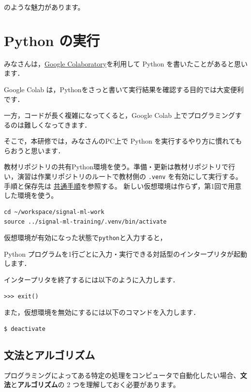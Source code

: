 のような魅力があります。


\section{Python の実行}

みなさんは，\href{https://colab.research.google.com/}{Google Colaboratory}を利用して Python を書いたことがあると思います．

Google Colab は，Pythonをさっと書いて実行結果を確認する目的では大変便利です．

一方，コードが長く複雑になってくると，Google Colab 上でプログラミングするのは難しくなってきます．

そこで，本研修では，みなさんのPC上で Python を実行するやり方に慣れてもらおうと思います．


教材リポジトリの共有Python環境を使う。準備・更新は教材リポジトリで行い，演習は作業リポジトリのルートで教材側の \texttt{.venv} を有効にして実行する。手順と保存先は \href{https://github.com/ykinolab-tokai/signal-ml-training/blob/main/handouts/README.md}{共通手順}を参照する。
新しい仮想環境は作らず，第1回で用意した環境を使う。

\begin{lstlisting}[style=codecell]
cd ~/workspace/signal-ml-work
source ../signal-ml-training/.venv/bin/activate
\end{lstlisting}

仮想環境が有効になった状態で\texttt{python}と入力すると，

Python プログラムを1行ごとに入力・実行できる対話型のインタープリタが起動します．

インタープリタを終了するには以下のように入力します．

\begin{lstlisting}[style=codecell]
>>> exit()
\end{lstlisting}

また，仮想環境を無効にするには以下のコマンドを入力します．

\begin{lstlisting}[style=codecell]
$ deactivate
\end{lstlisting}


\subsection{文法とアルゴリズム}


プログラミングによってある特定の処理をコンピュータで自動化したい場合、\textbf{文法}と\textbf{アルゴリズム}の 2 つを理解しておく必要があります。


